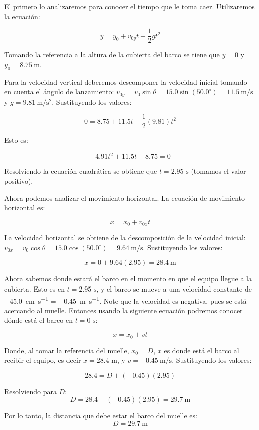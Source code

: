 \documentclass{article}
\begin{document}
\begin{enumerate}
    El primero lo analizaremos para conocer el tiempo que le toma caer. Utilizaremos la ecuación:

    \[
        y = y_0 + v_{0y} t - \frac{1}{2} g t^2
    \]

    Tomando la referencia a la altura de la cubierta del barco se tiene que $y = 0$ y $y_0 = \SI{8.75}{\meter}$.
    
    Para la velocidad vertical deberemos descomponer la velocidad inicial tomando en cuenta el ángulo de lanzamiento: $v_{0y} = v_0 \sin \theta = 15.0 \sin (50.0^\circ) = \SI{11.5}{\meter\per\second}$ y $g = \SI{9.81}{\meter\per\second\squared}$. Sustituyendo los valores:

    \[
        0 = 8.75 + 11.5 t - \frac{1}{2} (9.81) t^2
    \]

    Esto es:

    \[
        -4.91 t^2 + 11.5 t + 8.75 = 0
    \]

    Resolviendo la ecuación cuadrática se obtiene que $t = 2.95 \text{ s}$ (tomamos el valor positivo).

    Ahora podemos analizar el movimiento horizontal. La ecuación de movimiento horizontal es:

    \[
        x = x_0 + v_{0x} t
    \]

    La velocidad horizontal se obtiene de la descomposición de la velocidad inicial: $v_{0x} = v_0 \cos \theta = 15.0 \cos (50.0^\circ) = \SI{9.64}{\meter\per\second}$. Sustituyendo los valores:

    \[
        x = 0 + 9.64 (2.95) = \SI{28.4}{\meter}
    \]

    Ahora sabemos donde estará el barco en el momento en que el equipo llegue a la cubierta. Esto es en $t = 2.95 \text{ s}$, y el barco se mueve a una velocidad constante de \SI{-45.0}{\centi\meter\per\second} = \SI{-0.45}{\meter\per\second}. Note que la velocidad es negativa, pues se está acercando al muelle. Entonces usando la siguiente ecuación podremos conocer dónde está el barco en $t = 0 \text{ s}$:

    \[
        x = x_0 + v t
    \]

    Donde, al tomar la referencia del muelle, $x_0 = D$, $x$ es donde está el barco al recibir el equipo, es decir $x = 28.4 \text{ m}$, y $v = \SI{-0.45}{\meter\per\second}$. Sustituyendo los valores:

    \[
        28.4 = D + (-0.45) (2.95)
    \]

    Resolviendo para $D$:
    \[
        D = 28.4 - (-0.45) (2.95) = \SI{29.7}{\meter}
    \]

    Por lo tanto, la distancia que debe estar el barco del muelle es:
    \[
        \boxed{D = \SI{29.7}{\meter}}
    \]

\end{enumerate}
\end{document}
